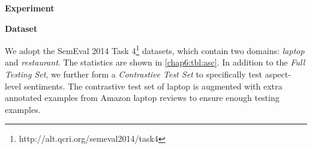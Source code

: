 

\textbf{Experiment}
\label{sec:exp}


\textbf{Dataset}

We adopt the SemEval 2014 Task 4\footnote{http://alt.qcri.org/semeval2014/task4} datasets, which 
contain two domains: \emph{laptop} and \emph{restaurant}. 
The statistics are shown in \ref{chap6:tbl:asc}. In addition to the \textit{Full Testing Set}, we further form a \textit{Contrastive Test Set} to specifically test aspect-level sentiments.
The contrastive test set of laptop is augmented with extra annotated examples from Amazon laptop reviews to ensure enough testing examples. 

